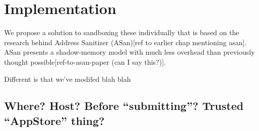 \chapter {Implementation}

We propose a solution to sandboxing these individually that is based on the
research behind Address Sanitizer (ASan)[ref to earlier chap mentioning asan].
ASan presents a shadow-memory model with much less overhead than previously 
thought possible[ref-to-asan-paper (can I say this?)].

Different is that we've modifed blah blah

\section {Where? Host? Before ``submitting''? Trusted ``AppStore'' thing?}
